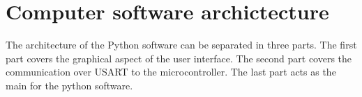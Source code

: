 \documentclass[conference]{IEEEtran}
\begin{document}






\section{Computer software archictecture}

The architecture of the Python software can be separated in three parts. The first part covers the graphical aspect of the user interface. The second part covers the communication over USART to the microcontroller. The last part acts as the main for the python software.
\end{document}
